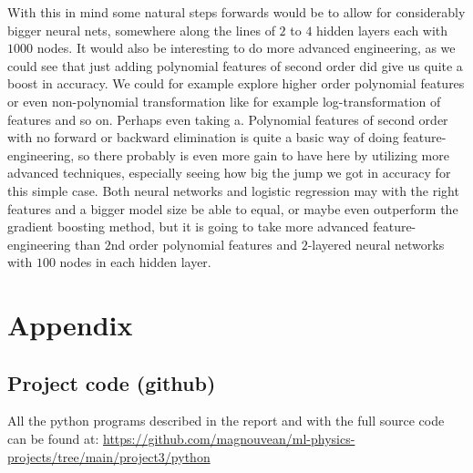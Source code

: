 \documentclass{article}
\begin{document}
With this in mind some natural steps forwards would be to allow for considerably
bigger neural nets, somewhere along the lines of $2$ to $4$ hidden layers each
with $1000$ nodes. It would also be interesting to do more advanced engineering,
as we could see that just adding polynomial features of second order did give us
quite a boost in accuracy. We could for example explore higher order polynomial
features or even non-polynomial transformation like for example
log-transformation of features and so on. Perhaps even taking a. Polynomial
features of second order with no forward or backward elimination is quite a
basic way of doing feature-engineering, so there probably is even more gain to
have here by utilizing more advanced techniques, especially seeing how big the
jump we got in accuracy for this simple case. Both neural networks and logistic
regression may with the right features and a bigger model size be able to equal,
or maybe even outperform the gradient boosting method, but it is going to take
more advanced feature-engineering than $2$nd order polynomial features and
$2$-layered neural networks with $100$ nodes in each hidden layer.

\section{Appendix}

\subsection{Project code (github)}
All the python programs described in the report and with the full source code can be
found at:
\url{https://github.com/magnouvean/ml-physics-projects/tree/main/project3/python}


\end{document}
